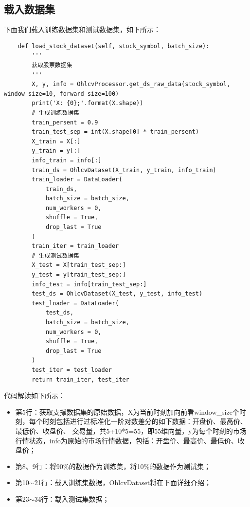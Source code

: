 \subsection{载入数据集}
下面我们载入训练数据集和测试数据集，如下所示：
\begin{lstlisting}
    def load_stock_dataset(self, stock_symbol, batch_size):
        '''
        获取股票数据集
        '''
        X, y, info = OhlcvProcessor.get_ds_raw_data(stock_symbol, window_size=10, forward_size=100)
        print('X: {0};'.format(X.shape))
        # 生成训练数据集
        train_persent = 0.9
        train_test_sep = int(X.shape[0] * train_persent)
        X_train = X[:]
        y_train = y[:]
        info_train = info[:]
        train_ds = OhlcvDataset(X_train, y_train, info_train)
        train_loader = DataLoader(
            train_ds,
            batch_size = batch_size,
            num_workers = 0,
            shuffle = True,
            drop_last = True
        )
        train_iter = train_loader
        # 生成测试数据集
        X_test = X[train_test_sep:]
        y_test = y[train_test_sep:]
        info_test = info[train_test_sep:]
        test_ds = OhlcvDataset(X_test, y_test, info_test)
        test_loader = DataLoader(
            test_ds,
            batch_size = batch_size,
            num_workers = 0,
            shuffle = True,
            drop_last = True
        )
        test_iter = test_loader
        return train_iter, test_iter
\end{lstlisting}
代码解读如下所示：
\begin{itemize}
    \item 第5行：获取支撑数据集的原始数据，X为当前时刻加向前看window\_size个时刻，每个时刻包括进行过标准化一阶对数差分的如下数据：开盘价、最高价、最低价、收盘价、
    交易量，共5+10*5=55，即55维向量，y为每个时刻的市场行情状态，info为原始的市场行情数据，包括：开盘价、最高价、最低价、收盘价；
    \item 第8、9行：将90\%的数据作为训练集，将10\%的数据作为测试集；
    \item 第10$\sim$21行：载入训练集数据，OhlcvDataset将在下面详细介绍；
    \item 第23$\sim$34行：载入测试集数据；
\end{itemize}
